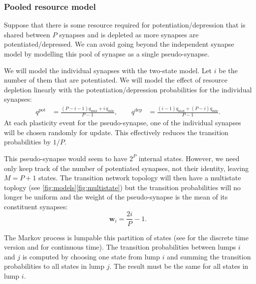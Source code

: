 \documentclass[12pt]{article}
\newcommand{\w}{\mathbf{w}}
\newcommand{\pot}{^{\text{pot}}}
\newcommand{\dep}{^{\text{dep}}}
\newcommand{\lmax}{_{\text{max}}}
\newcommand{\lmin}{_{\text{min}}}
\begin{document}
\subsubsection{Pooled resource model}\label{sec:pooledmodel}

Suppose that there is some resource required for potentiation/depression that is shared between $P$ synapses and is depleted as more synapses are potentiated/depressed.
We can avoid going beyond the independent synapse model by modelling this pool of synapse as a single pseudo-synapse.

We will model the individual synapses with the two-state model. 
Let $i$ be the number of them that are potentiated.
We will model the effect of resource depletion linearly with the potentiation/depression probabilities for the individual synapses:
%
\begin{equation}\label{eq:depletion}
  \begin{aligned}
    q\pot &= \frac{(P-i-1)q\lmax + i\,q\lmin}{P-1}, \qquad
    q\dep &= \frac{(i-1)q\lmax + (P-i)q\lmin}{P-1}.
  \end{aligned}
\end{equation}
%
At each plasticity event for the pseudo-synapse, one of the individual synapses will be chosen randomly for update.
This effectively reduces the transition probabilities by $1/P$.

This pseudo-synapse would seem to have $2^P$ internal states.
However, we need only keep track of the number of potentiated synapses, not their identity, leaving $M=P+1$ states.
The transition network topology will then have a multistate toplogy (see \autoref{fig:models}\ref{fig:multistate}) but the transition probabilities will no longer be uniform and the weight of the pseudo-synapse is the mean of its constituent synapses:
%
\begin{equation}\label{eq:pooledweight}
  \w_i = \frac{2i}{P}-1.
\end{equation}
%


The Markov process is lumpable \wrt this partition of states (see \cite[\S6.3]{kemeny1960finite} for the discrete time version and \cite{burke1958markovian,Ball1993Lumpability} for continuous time).
The transition probabilities between lumps $i$ and $j$ is computed by choosing one state from lump $i$ and summing the transition probabilities to all states in lump $j$.
The result must be the same for all states in lump $i$.
\end{document}
